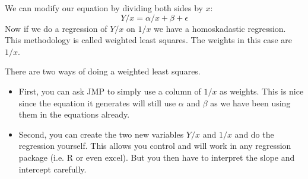 \documentclass{article} %
\begin{document}
We can modify our equation by dividing both sides by $x$:
\begin{displaymath}
Y/x = \alpha/x + \beta +  \epsilon
\end{displaymath}
Now if we do a regression of $Y/x$ on $1/x$ we have a homoskadastic
regression.  This methodology is called weighted least squares.  The
weights in this case are $1/x$.

There are two ways of doing a weighted least squares. 
\begin{itemize}
\item  First, you can
ask JMP to simply use a column of $1/x$ as weights.  This is nice
since the equation it generates will still use $\alpha$ and $\beta$ as
we have been using them in the equations already.  
\item Second, you can create the two new variables $Y/x$ and $1/x$ and
do the regression yourself.  This allows you control and will work in
any regression package (i.e. R or even excel).  But you then have to
interpret the slope and intercept carefully.
\end{itemize}
\end{document}
